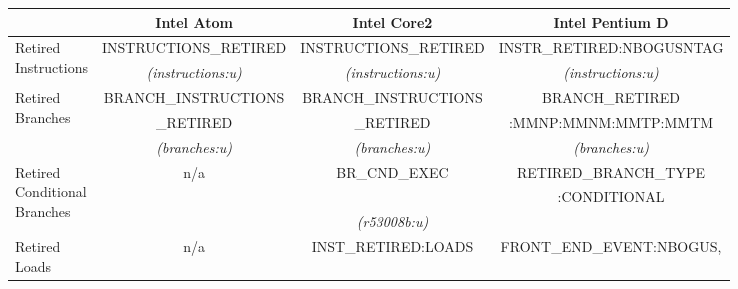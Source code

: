 \begin{tabular}{|l||c|c|c|}

\hline
                  & 
Intel Atom        & 
Intel Core2       &
Intel Pentium D \\
\hline
\hline


\multirow{2}{*}{\parbox{0.5in}{Retired \\
Instructions}}            &
INSTRUCTIONS\_RETIRED     & %
INSTRUCTIONS\_RETIRED     & %
INSTR\_RETIRED:NBOGUSNTAG \\ %
          &
{\em (instructions:u)}      & %
{\em (instructions:u)}      & %
{\em (instructions:u)}      \\ %

\hline
\multirow{3}{*}{\parbox{0.5in}{Retired \\
Branches}}                 &  
BRANCH\_INSTRUCTIONS      & %
BRANCH\_INSTRUCTIONS      & %
BRANCH\_RETIRED           \\ %

                  &  
\_RETIRED      & %
\_RETIRED      & %
:MMNP:MMNM:MMTP:MMTM \\ %

                      &
{\em (branches:u)}         & %
{\em (branches:u)}         & %
{\em (branches:u)}         \\ %

\hline
\multirow{3}{*}{\parbox{0.5in}{Retired \\
Conditional \\
Branches}}                &  
\multirow{3}{*}{n/a}      & %
\multirow{2}{*}{BR\_CND\_EXEC}             & %
RETIRED\_BRANCH\_TYPE  \\ %
                  &  
& %
& %
:CONDITIONAL      \\ %



			&
			& %
{\em (r53008b:u)}	& %
			\\ %



\hline
\multirow{3}{*}{\parbox{0.5in}{Retired \\
Loads}}   &  
\multirow{3}{*}{n/a}				& %
\multirow{2}{*}{INST\_RETIRED:LOADS}		& %
FRONT\_END\_EVENT:NBOGUS, 			\\ %


\end{tabular}
